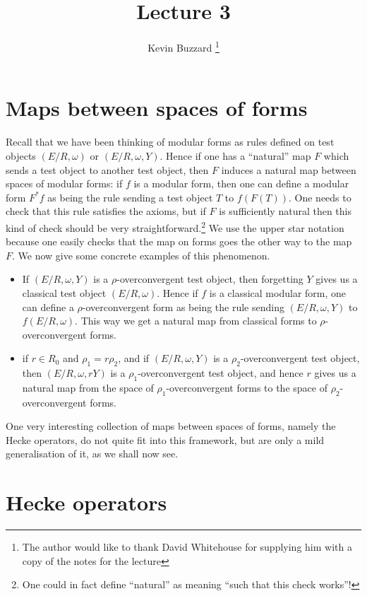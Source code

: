 \documentclass{article}
\title{Lecture 3}
\author{Kevin Buzzard
\thanks{The author would like to thank David Whitehouse for supplying
him with a copy of the notes for the lecture}
}
\begin{document}
\maketitle %

\section{Maps between spaces of forms}
Recall that we have been thinking of modular forms as rules defined
on test objects $(E/R,\omega)$ or $(E/R,\omega,Y)$. Hence
if one has a ``natural'' map $F$ which sends a test object to
another test object, then $F$ induces a natural map between spaces of modular
forms: if $f$ is a modular form, then one can define a modular form
$F^*f$ as being the rule sending a test object $T$ to $f(F(T))$. One needs
to check that this rule satisfies the axioms, but if $F$ is sufficiently
natural then this kind of check should be very
straightforward.\footnote{One could in fact define ``natural'' as meaning
``such that this check works''!} We use the upper star
notation because one easily checks that the map on forms goes the other
way to the map $F$. We now give some concrete examples of this phenomenon.

\begin{itemize}
\item If $(E/R,\omega,Y)$ is a $\rho$-overconvergent test object,
then forgetting $Y$ gives us a classical test object $(E/R,\omega)$.
Hence if $f$ is a classical modular form, one can define a
$\rho$-overconvergent form as being the rule sending $(E/R,\omega,Y)$
to $f(E/R,\omega)$. This way we get a natural map from classical
forms to $\rho$-overconvergent forms.

\item if $r\in R_0$ and $\rho_1=r\rho_2$, and if $(E/R,\omega,Y)$ is
a $\rho_2$-overconvergent test object, then $(E/R,\omega,rY)$ is
a $\rho_1$-overconvergent test object, and hence $r$ gives us a natural
map from the space of $\rho_1$-overconvergent forms to the space of
$\rho_2$-overconvergent forms.
\end{itemize}
One very interesting collection of maps between spaces of forms,
namely the Hecke operators, do not quite fit into this framework, but
are only a mild generalisation of it, as we shall now see.

\section{Hecke operators}
\end{document}
